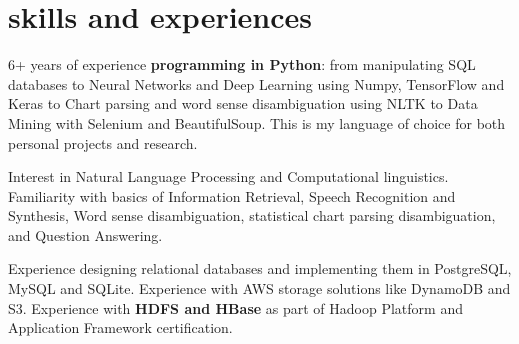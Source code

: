 \documentclass[]{cv-roald}
\begin{document}
\section*{skills and experiences}
\begin{tabitemize}
    \item 6+ years of experience \textbf{programming in Python}: from manipulating SQL databases to Neural Networks and Deep Learning using Numpy, TensorFlow and Keras to Chart parsing and word sense disambiguation using NLTK to Data Mining with Selenium and BeautifulSoup. This is my language of choice for both personal projects and research. 
    \item Interest in Natural Language Processing and Computational linguistics. Familiarity with basics of Information Retrieval, Speech Recognition and Synthesis, Word sense disambiguation, statistical chart parsing disambiguation, and Question Answering.
    \item Experience designing relational databases and implementing them in PostgreSQL, MySQL and SQLite. Experience with AWS storage solutions like DynamoDB and S3. Experience with \textbf{HDFS and HBase} as part of Hadoop Platform and Application Framework certification.

\end{tabitemize}
\end{document}
